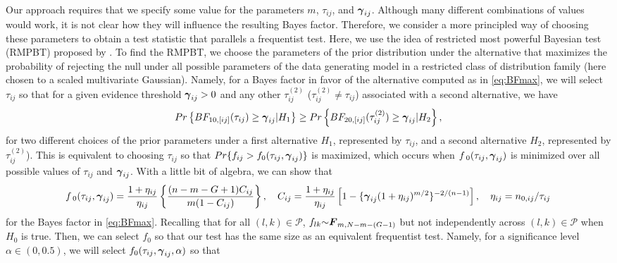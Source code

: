 \documentclass[APA,Times1COL]{WileyNJDv5} %
\newcommand{\uF}       {\mbox{\boldmath$F$}}
\newcommand{\ugamma}            {\mbox{\boldmath$\gamma$}}
\begin{document}
Our approach requires that we specify some value for the parameters $m$, $\tau_{ij}$, and $\ugamma_{ij}$. Although many different combinations of values would work, it is not clear how they will influence the resulting Bayes factor. Therefore, we consider a more principled way of choosing these parameters to obtain a test statistic that parallels a frequentist test.   
Here, we use the idea of restricted most powerful Bayesian test (RMPBT) proposed by \cite{GoddardJohnson}. To find the RMPBT, we choose the parameters of the prior distribution under the alternative that maximizes the probability of rejecting the null under all possible parameters of the data generating model in a restricted class of distribution family (here chosen to a scaled multivariate Gaussian). Namely, for a Bayes factor in favor of the alternative computed as in \eqref{eq:BFmax}, we will select $\tau_{ij}$ so that for a given evidence threshold $\ugamma_{ij} > 0$ and any other $\tau^{(2)}_{ij}$ ($\tau^{(2)}_{ij} \neq \tau_{ij}$) associated with a second alternative, we have
$$Pr\left\{BF_{10,[ij]}(\tau_{ij}) \geq  \ugamma_{ij} | H_{1} \right\} \geq Pr\left\{BF_{20,[ij]}(\tau^{(2)}_{ij}) \geq \ugamma_{ij} | H_{2} \right\},$$
for two different choices of the prior parameters under a first alternative $H_1$, represented by $\tau_{ij}$, and a second alternative $H_2$, represented by $\tau^{(2)}_{ij}$). This is equivalent to choosing $\tau_{ij}$ so that $Pr\{f_{ij} > f_{0}(\tau_{ij},\ugamma_{ij})\}$ is maximized, which occurs when $f_{\;0}(\tau_{ij},\ugamma_{ij})$ is minimized over all possible values of $\tau_{ij}$ and $\ugamma_{ij}$. With a little bit of algebra, we can show that 
\begin{align*}
    f_{\;0}(\tau_{ij},\ugamma_{ij}) = \frac{1+\eta_{ij}}{\eta_{ij}} \left\{ \frac{(n - m -G+1)C_{ij}}{m(1 - C_{ij})} \right\},\quad
    C_{ij} = \frac{1+\eta_{ij}}{\eta_{ij}}\left[ 1 - \{\ugamma_{ij}(1+\eta_{ij})^{m/2} \}^{-2/(n-1)}  \right],\quad\eta_{ij} = n_{0,ij}/\tau_{ij}
\end{align*}
for the Bayes factor in \eqref{eq:BFmax}. 
Recalling that for all $(l,k) \in \mathcal{P}$, $f_{lk} {\sim} \uF_{m, N - m- (G-1)}$ but not independently across $(l, k)\in\mathcal{P}$ when $H_0$ is true. Then, we can select $f_{0}$ so that our test has the same size as an equivalent frequentist test. Namely, for a significance level $\alpha \in (0, 0.5)$, we will select $f_0(\tau_{ij},\ugamma_{ij}, \alpha)$ so that 
\end{document}
